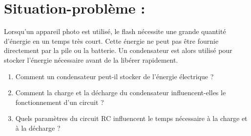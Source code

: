 \documentclass[12pt]{article}
\begin{document}
\section*{Situation-problème :}

Lorsqu'un appareil photo est utilisé, le flash nécessite une grande quantité d'énergie en un temps très court. Cette énergie ne peut pas être fournie directement par la pile ou la batterie. Un condensateur est alors utilisé pour stocker l'énergie nécessaire avant de la libérer rapidement.

\begin{enumerate}
  \item Comment un condensateur peut-il stocker de l’énergie électrique ?
  \item Comment la charge et la décharge du condensateur influencent-elles le fonctionnement d’un circuit ?
  \item Quels paramètres du circuit RC influencent le temps nécessaire à la charge et à la décharge ?
\end{enumerate}
\end{document}
